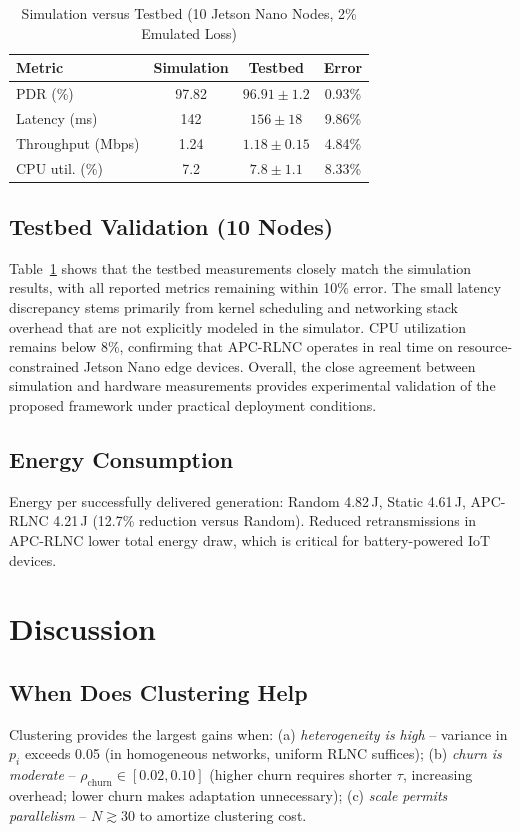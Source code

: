 \documentclass[journal]{IEEEtran}
\begin{document}
\begin{table}[!t]
\caption{Simulation versus Testbed (10 Jetson Nano Nodes, 2\% Emulated Loss)}
\label{tab:sim-vs-testbed}
\centering
\footnotesize
\begin{tabular}{lccc}
\hline
Metric & Simulation & Testbed & Error \\
\hline
PDR (\%)           & 97.82 & $96.91 \pm 1.2$  & 0.93\% \\
Latency (ms)       & 142   & $156 \pm 18$     & 9.86\% \\
Throughput (Mbps)  & 1.24  & $1.18 \pm 0.15$  & 4.84\% \\
CPU util. (\%)     & 7.2   & $7.8 \pm 1.1$    & 8.33\% \\
\hline
\end{tabular}
\end{table}

\subsection{Testbed Validation (10 Nodes)}
Table~\ref{tab:sim-vs-testbed} shows that the testbed measurements
closely match the simulation results, with all reported metrics
remaining within 10\% error. The small latency discrepancy stems
primarily from kernel scheduling and networking stack overhead that
are not explicitly modeled in the simulator. CPU utilization remains
below 8\%, confirming that APC-RLNC operates in real time on
resource-constrained Jetson Nano edge devices. Overall, the close
agreement between simulation and hardware measurements provides
experimental validation of the proposed framework under practical
deployment conditions.

\subsection{Energy Consumption}
Energy per successfully delivered generation: Random 4.82\,J, Static 4.61\,J, APC-RLNC 4.21\,J (12.7\% reduction versus Random). Reduced retransmissions in APC-RLNC lower total energy draw, which is critical for battery-powered IoT devices.

\section{Discussion}
\label{sec:discussion}

\subsection{When Does Clustering Help}
Clustering provides the largest gains when: (a) \emph{heterogeneity is high} -- variance in $p_i$ exceeds 0.05 (in homogeneous networks, uniform RLNC suffices); (b) \emph{churn is moderate} -- $\rho_{\text{churn}} \in [0.02, 0.10]$ (higher churn requires shorter $\tau$, increasing overhead; lower churn makes adaptation unnecessary); (c) \emph{scale permits parallelism} -- $N \gtrsim 30$ to amortize clustering cost.
\end{document}
